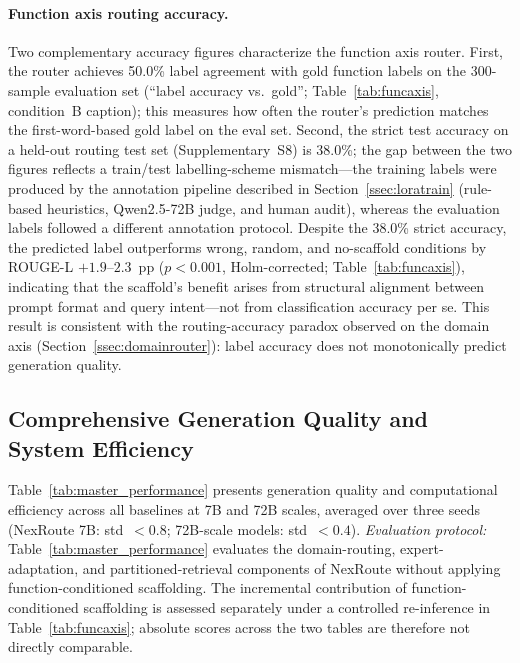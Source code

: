 \documentclass[a4paper,fleql,doubleblind]{cas-sc}
\begin{document}
\paragraph{Function axis routing accuracy.}
Two complementary accuracy figures characterize the function axis router.
First, the router achieves 50.0\% label agreement with gold function labels
on the 300-sample evaluation set (``label accuracy vs.\ gold''; Table~\ref{tab:funcaxis},
condition~B caption); this measures how often the router's prediction matches
the first-word-based gold label on the eval set.
Second, the strict test accuracy on a held-out routing test set
(Supplementary~S8) is 38.0\%; the gap between the two figures reflects
a train/test labelling-scheme mismatch---the training labels were produced by the
annotation pipeline described in Section~\ref{ssec:loratrain} (rule-based heuristics,
Qwen2.5-72B judge, and human audit), whereas the evaluation labels followed a
different annotation protocol.
Despite the 38.0\% strict accuracy, the predicted label outperforms wrong, random,
and no-scaffold conditions by ROUGE-L $+1.9$--$2.3$~pp ($p{<}0.001$, Holm-corrected;
Table~\ref{tab:funcaxis}), indicating that the scaffold's benefit arises from
structural alignment between prompt format and query intent---not from classification
accuracy per se.
This result is consistent with the routing-accuracy paradox observed on the domain
axis (Section~\ref{ssec:domainrouter}): label accuracy does not monotonically
predict generation quality.

\subsection{Comprehensive Generation Quality and System Efficiency}
\label{ssec:comprehensive}
Table~\ref{tab:master_performance} presents generation quality and computational efficiency across all baselines at 7B and 72B scales, averaged over three seeds (NexRoute 7B: std\ $<0.8$; 72B-scale models: std\ $<0.4$).
\emph{Evaluation protocol:} Table~\ref{tab:master_performance} evaluates the domain-routing,
expert-adaptation, and partitioned-retrieval components of NexRoute without applying
function-conditioned scaffolding. The incremental contribution of function-conditioned
scaffolding is assessed separately under a controlled re-inference in
Table~\ref{tab:funcaxis}; absolute scores across the two tables are therefore not
directly comparable.
\end{document}
